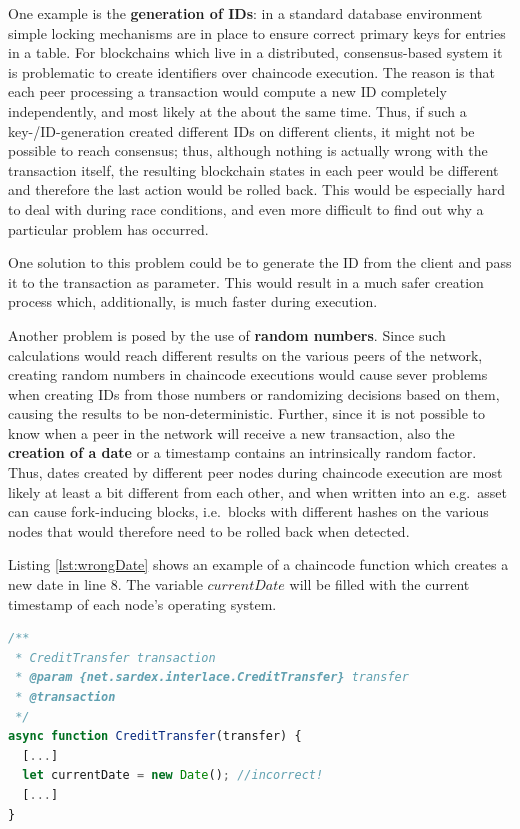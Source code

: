 One example is the \textbf{generation of IDs}: in a standard database environment simple locking mechanisms are in place to ensure correct primary keys for entries in a table. For blockchains which live in a distributed, consensus-based system it is problematic to create identifiers over chaincode execution. The reason is that each peer processing a transaction would compute a new ID completely independently, and most likely at the about the same time. Thus, if such a key-/ID-generation created different IDs on different clients, it might not be possible to reach consensus; thus, although nothing is actually wrong with the transaction itself, the resulting blockchain states in each peer would be different and therefore the last action would be rolled back. This would be especially hard to deal with during race conditions, and even more difficult to find out why a particular problem has occurred.

One solution to this problem could be to generate the ID from the client and pass it to the transaction as parameter. This would result in a much safer creation process which, additionally, is much faster during execution.

Another problem is posed by the use of \textbf{random numbers}. Since such calculations would reach different results on the various peers of the network,  creating random numbers in chaincode executions would cause sever problems when creating IDs from those numbers or randomizing decisions based on them, causing the results to be non-deterministic. Further, since it is not possible to know when a peer in the network will receive a new transaction, also the \textbf{creation of a date} or a timestamp contains an intrinsically random factor. Thus, dates created by different peer nodes during chaincode execution are most likely at least a bit different from each other, and when written into an e.g.\ asset can cause fork-inducing blocks, i.e.\ blocks with different hashes on the various nodes that would therefore need to be rolled back when detected.

Listing \ref{lst:wrongDate} shows an example of a chaincode function which creates a new date in line 8. The variable $currentDate$ will be filled with the current timestamp of each node's operating system.

\begin{center}
\begin{minipage}{0.8\textwidth}
\small
\begin{lstlisting}[language=javascript,firstnumber=1,caption={\bf\small An example of chaincode with wrong determination of the current date}, captionpos=b,label=lst:wrongDate]
/**
 * CreditTransfer transaction
 * @param {net.sardex.interlace.CreditTransfer} transfer
 * @transaction
 */
async function CreditTransfer(transfer) {
  [...]
  let currentDate = new Date(); //incorrect!
  [...]
}
\end{lstlisting}
\end{minipage}
\end{center}

